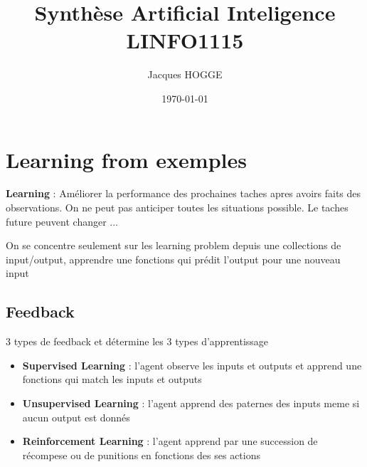\documentclass[12pt]{article}
\title{Synthèse Artificial Inteligence LINFO1115}
\author{Jacques HOGGE}
\date{\today}
\begin{document}
\maketitle
\newpage
\tableofcontents
\newpage



\newpage



\newpage



\newpage



\newpage



\newpage



\newpage



\newpage



\newpage



\newpage



\newpage


		
			
\section{Learning from exemples}
	\textbf{Learning} : Améliorer la performance des prochaines taches apres avoirs faits des observations. On ne peut pas anticiper toutes les situations possible. Le taches future peuvent changer ...
	
	On se concentre seulement sur les learning problem depuis une collections de input/output, apprendre une fonctions qui prédit l'output pour une nouveau input
	
	\subsection{Feedback}
		3 types de feedback et détermine les 3 types d'apprentissage
		\begin{itemize}
			\item \textbf{Supervised Learning} : l'agent observe les inputs et outputs et apprend une fonctions qui match les inputs et outputs
			\item \textbf{Unsupervised Learning} : l'agent apprend des paternes des inputs meme si aucun output est donnés
			\item \textbf{Reinforcement Learning} : l'agent apprend par une succession de récompese ou de punitions en fonctions des ses actions
			
		\end{itemize}
		
\end{document}
